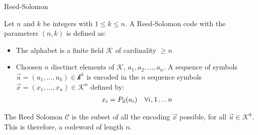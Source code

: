 \begin{parag}{Reed-Solomon}
   \begin{definition}
   Let $n$ and $k$ be integers with $1 \leq k \leq n$. A Reed-Solomon code with the parameters $\left(n, k\right)$ is defined as:
   \begin{itemize}
       \item The alphabet is a finite field $\mathcal{K}$ of cardinality $\geq n$
       \item Choosen $n$ disctinct elements of $\mathcal{K}$, $a_1, a_2, \ldots, a_n$. A sequence of symbols $\vec{u}=  \left(u_1, \ldots, u_k\right) \in \mathcal{k}^k$ is encoded in the $n$ sequence symbols $\vec{x} = \left(x_1, \ldots, x_n\right) \in \mathcal{K}^n$ defined by:
           \begin{align*} 
               x_i =  P_{\vec{u}}\left(a_i\right) \mathspace \forall i, 1\ldots n
           \end{align*}
   \end{itemize}
   The Reed Solomon $\mathcal{C}$ is the subset of all the encoding $\vec{x}$ possible, for all $\vec{u} \in \mathcal{K}^k$. This is therefore, a codeword of length $n$.
   \end{definition} 
\end{parag}
